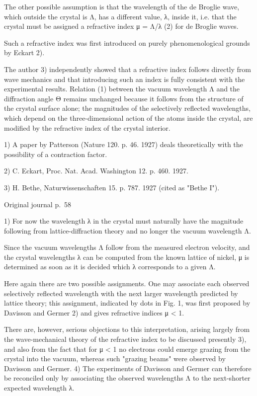 \documentclass[10pt]{article}
\newcommand{\origpage}[1]{\par\medskip\noindent\hfill{\small\color{notegray}Original journal p.~#1}\hfill\mbox{}\par\smallskip}
\begin{document}
The other possible assumption is that the wavelength of the de Broglie wave, which outside the crystal is Λ, has a different value, λ, inside it, i.e. that the crystal must be assigned a refractive index μ = Λ/λ (2) for de Broglie waves.\par
Such a refractive index was first introduced on purely phenomenological grounds by Eckart 2).\par
The author 3) independently showed that a refractive index follows directly from wave mechanics and that introducing such an index is fully consistent with the experimental results. Relation (1) between the vacuum wavelength Λ and the diffraction angle Θ remains unchanged because it follows from the structure of the crystal surface alone; the magnitudes of the selectively reflected wavelengths, which depend on the three-dimensional action of the atoms inside the crystal, are modified by the refractive index of the crystal interior.\par
\noindent\footnotesize 1) A paper by Patterson (Nature 120. p. 46. 1927) deals theoretically with the possibility of a contraction factor.\par\normalsize
\noindent\footnotesize 2) C. Eckart, Proc. Nat. Acad. Washington 12. p. 460. 1927.\par\normalsize
\noindent\footnotesize 3) H. Bethe, Naturwissenschaften 15. p. 787. 1927 (cited as "Bethe I").\par\normalsize
\origpage{58}
\noindent\footnotesize 1) For now the wavelength λ in the crystal must naturally have the magnitude following from lattice-diffraction theory and no longer the vacuum wavelength Λ.\par\normalsize
Since the vacuum wavelengths Λ follow from the measured electron velocity, and the crystal wavelengths λ can be computed from the known lattice of nickel, μ is determined as soon as it is decided which λ corresponds to a given Λ.\par
Here again there are two possible assignments. One may associate each observed selectively reflected wavelength with the next larger wavelength predicted by lattice theory; this assignment, indicated by dots in Fig. 1, was first proposed by Davisson and Germer 2) and gives refractive indices μ < 1.\par
There are, however, serious objections to this interpretation, arising largely from the wave-mechanical theory of the refractive index to be discussed presently 3), and also from the fact that for μ < 1 no electrons could emerge grazing from the crystal into the vacuum, whereas such "grazing beams" were observed by Davisson and Germer. 4) The experiments of Davisson and Germer can therefore be reconciled only by associating the observed wavelengths Λ to the next-shorter expected wavelength λ.\par
\end{document}
